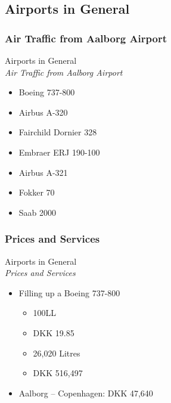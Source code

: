 \subsection{Airports in General}

\subsubsection{Air Traffic from Aalborg Airport}
\begin{frame}{Airports in General\\\small\textit{Air Traffic from Aalborg Airport}}{}
	\begin{itemize}
		\item Boeing 737-800 
		\item Airbus A-320 
		\item Fairchild Dornier 328 
		\item Embraer ERJ 190-100 
		\item Airbus A-321 
		\item Fokker 70 
		\item Saab 2000 
	\end{itemize}
\end{frame}

\subsubsection{Prices and Services}
\begin{frame}{Airports in General\\\small\textit{Prices and Services}}{}
	\begin{itemize}
		\item Filling up a Boeing 737-800
			\begin{itemize}
				\item 100LL
				\item DKK 19.85
				\item 26,020 Litres
				\item DKK 516,497
			\end{itemize}
		\item Aalborg – Copenhagen: DKK 47,640
	\end{itemize}
\end{frame}

